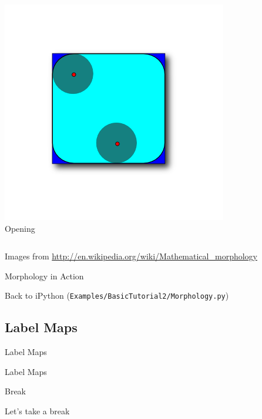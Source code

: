 \begin{frame}[fragile]
\begin{columns}[c]
\begin{center}
\includegraphics[width=1\textwidth]{Images/Opening_shadow} \\
Opening
\end{center}
\end{columns}
\vspace{12pt}
Images from \url{http://en.wikipedia.org/wiki/Mathematical_morphology}
\end{frame}

\begin{frame}{Morphology in Action}
\center
\begin{center}
Back to iPython (\texttt{Examples/BasicTutorial2/Morphology.py})
\end{center}
\end{frame}


\subsection{Label Maps}

\begin{frame}{Label Maps}
\fontsize{36pt}{36pt}\selectfont
\center
\begin{center}
Label Maps
\end{center}
\end{frame}

\begin{frame}{Break}
\fontsize{36pt}{36pt}\selectfont
\center
\begin{center}
Let's take a break
\end{center}
\end{frame}

